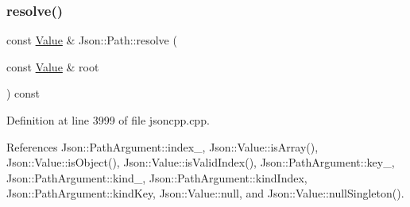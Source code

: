 \subsubsection{\texorpdfstring{resolve()}{resolve()}\hspace{0.1cm}{\footnotesize\ttfamily [1/2]}}
{\footnotesize\ttfamily const \hyperlink{class_json_1_1_value}{Value} \& Json\+::\+Path\+::resolve (\begin{DoxyParamCaption}\item[{const \hyperlink{class_json_1_1_value}{Value} \&}]{root }\end{DoxyParamCaption}) const}



Definition at line 3999 of file jsoncpp.\+cpp.



References Json\+::\+Path\+Argument\+::index\+\_\+, Json\+::\+Value\+::is\+Array(), Json\+::\+Value\+::is\+Object(), Json\+::\+Value\+::is\+Valid\+Index(), Json\+::\+Path\+Argument\+::key\+\_\+, Json\+::\+Path\+Argument\+::kind\+\_\+, Json\+::\+Path\+Argument\+::kind\+Index, Json\+::\+Path\+Argument\+::kind\+Key, Json\+::\+Value\+::null, and Json\+::\+Value\+::null\+Singleton().



